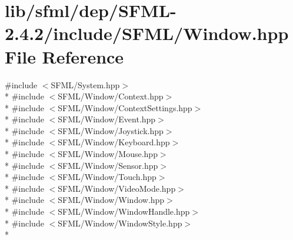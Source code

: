 \hypertarget{sfml_2dep_2_s_f_m_l-2_84_82_2include_2_s_f_m_l_2_window_8hpp}{\section{lib/sfml/dep/\-S\-F\-M\-L-\/2.4.2/include/\-S\-F\-M\-L/\-Window.hpp File Reference}
\label{sfml_2dep_2_s_f_m_l-2_84_82_2include_2_s_f_m_l_2_window_8hpp}
}
{\ttfamily \#include $<$S\-F\-M\-L/\-System.\-hpp$>$}\\*
{\ttfamily \#include $<$S\-F\-M\-L/\-Window/\-Context.\-hpp$>$}\\*
{\ttfamily \#include $<$S\-F\-M\-L/\-Window/\-Context\-Settings.\-hpp$>$}\\*
{\ttfamily \#include $<$S\-F\-M\-L/\-Window/\-Event.\-hpp$>$}\\*
{\ttfamily \#include $<$S\-F\-M\-L/\-Window/\-Joystick.\-hpp$>$}\\*
{\ttfamily \#include $<$S\-F\-M\-L/\-Window/\-Keyboard.\-hpp$>$}\\*
{\ttfamily \#include $<$S\-F\-M\-L/\-Window/\-Mouse.\-hpp$>$}\\*
{\ttfamily \#include $<$S\-F\-M\-L/\-Window/\-Sensor.\-hpp$>$}\\*
{\ttfamily \#include $<$S\-F\-M\-L/\-Window/\-Touch.\-hpp$>$}\\*
{\ttfamily \#include $<$S\-F\-M\-L/\-Window/\-Video\-Mode.\-hpp$>$}\\*
{\ttfamily \#include $<$S\-F\-M\-L/\-Window/\-Window.\-hpp$>$}\\*
{\ttfamily \#include $<$S\-F\-M\-L/\-Window/\-Window\-Handle.\-hpp$>$}\\*
{\ttfamily \#include $<$S\-F\-M\-L/\-Window/\-Window\-Style.\-hpp$>$}\\*
